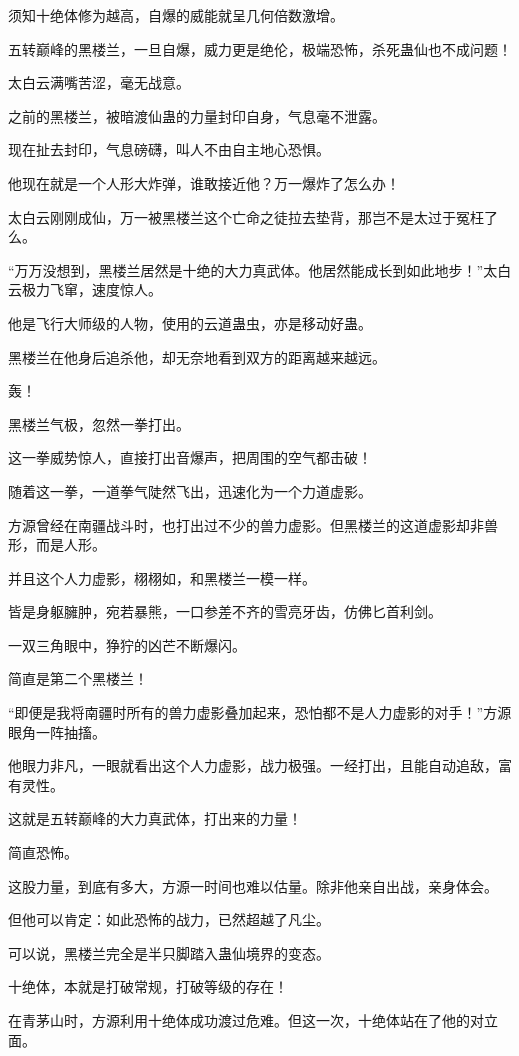 \begin{this_body}
须知十绝体修为越高，自爆的威能就呈几何倍数激增。

五转巅峰的黑楼兰，一旦自爆，威力更是绝伦，极端恐怖，杀死蛊仙也不成问题！

太白云满嘴苦涩，毫无战意。

之前的黑楼兰，被暗渡仙蛊的力量封印自身，气息毫不泄露。

现在扯去封印，气息磅礴，叫人不由自主地心恐惧。

他现在就是一个人形大炸弹，谁敢接近他？万一爆炸了怎么办！

太白云刚刚成仙，万一被黑楼兰这个亡命之徒拉去垫背，那岂不是太过于冤枉了么。

“万万没想到，黑楼兰居然是十绝的大力真武体。他居然能成长到如此地步！”太白云极力飞窜，速度惊人。

他是飞行大师级的人物，使用的云道蛊虫，亦是移动好蛊。

黑楼兰在他身后追杀他，却无奈地看到双方的距离越来越远。

轰！

黑楼兰气极，忽然一拳打出。

这一拳威势惊人，直接打出音爆声，把周围的空气都击破！

随着这一拳，一道拳气陡然飞出，迅速化为一个力道虚影。

方源曾经在南疆战斗时，也打出过不少的兽力虚影。但黑楼兰的这道虚影却非兽形，而是人形。

并且这个人力虚影，栩栩如，和黑楼兰一模一样。

皆是身躯臃肿，宛若暴熊，一口参差不齐的雪亮牙齿，仿佛匕首利剑。

一双三角眼中，狰狞的凶芒不断爆闪。

简直是第二个黑楼兰！

“即便是我将南疆时所有的兽力虚影叠加起来，恐怕都不是人力虚影的对手！”方源眼角一阵抽搐。

他眼力非凡，一眼就看出这个人力虚影，战力极强。一经打出，且能自动追敌，富有灵性。

这就是五转巅峰的大力真武体，打出来的力量！

简直恐怖。

这股力量，到底有多大，方源一时间也难以估量。除非他亲自出战，亲身体会。

但他可以肯定：如此恐怖的战力，已然超越了凡尘。

可以说，黑楼兰完全是半只脚踏入蛊仙境界的变态。

十绝体，本就是打破常规，打破等级的存在！

在青茅山时，方源利用十绝体成功渡过危难。但这一次，十绝体站在了他的对立面。


\end{this_body}
